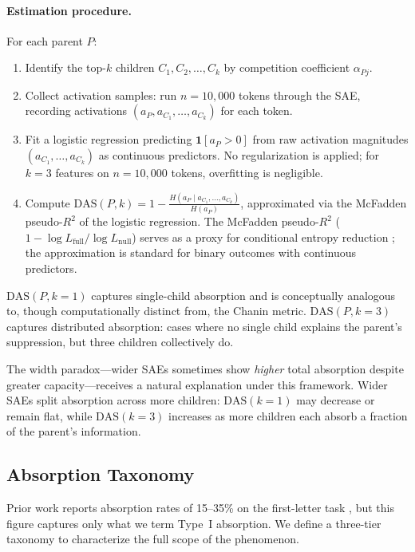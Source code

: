 \documentclass{article}
\begin{document}
\paragraph{Estimation procedure.} For each parent $P$:
\begin{enumerate}
  \item Identify the top-$k$ children $C_1, C_2, \ldots, C_k$ by competition coefficient $\alpha_{Pj}$.
  \item Collect activation samples: run $n = 10{,}000$ tokens through the SAE, recording activations $(a_P, a_{C_1}, \ldots, a_{C_k})$ for each token.
  \item Fit a logistic regression predicting $\mathbf{1}[a_P > 0]$ from raw activation magnitudes $(a_{C_1}, \ldots, a_{C_k})$ as continuous predictors. No regularization is applied; for $k = 3$ features on $n = 10{,}000$ tokens, overfitting is negligible.
  \item Compute $\text{DAS}(P, k) = 1 - \frac{H(a_P \mid a_{C_1}, \ldots, a_{C_k})}{H(a_P)}$, approximated via the McFadden pseudo-$R^2$ of the logistic regression. The McFadden pseudo-$R^2$ ($1 - \log L_{\text{full}} / \log L_{\text{null}}$) serves as a proxy for conditional entropy reduction \citep{hagle1992goodness}; the approximation is standard for binary outcomes with continuous predictors.
\end{enumerate}

$\text{DAS}(P, k{=}1)$ captures single-child absorption and is conceptually analogous to, though computationally distinct from, the Chanin metric. $\text{DAS}(P, k{=}3)$ captures distributed absorption: cases where no single child explains the parent's suppression, but three children collectively do.

The width paradox---wider SAEs sometimes show \emph{higher} total absorption despite greater capacity---receives a natural explanation under this framework. Wider SAEs split absorption across more children: $\text{DAS}(k{=}1)$ may decrease or remain flat, while $\text{DAS}(k{=}3)$ increases as more children each absorb a fraction of the parent's information.


\subsection{Absorption Taxonomy}
\label{sec:taxonomy}

Prior work reports absorption rates of 15--35\% on the first-letter task \citep{chanin2024absorption}, but this figure captures only what we term Type~I absorption. We define a three-tier taxonomy to characterize the full scope of the phenomenon.
\end{document}
